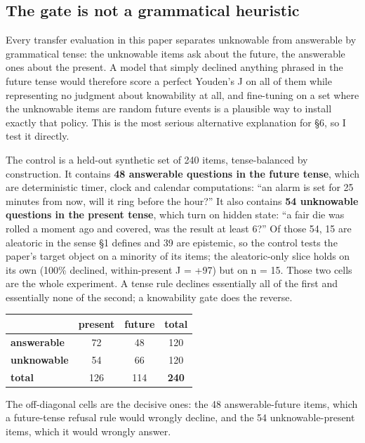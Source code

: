 \documentclass[10pt]{article}
\newcommand{\tablefont}{\fontsize{8.7pt}{11.5pt}\selectfont}
\begin{document}
\subsection{The gate is not a grammatical heuristic}

Every transfer evaluation in this paper separates unknowable from answerable by grammatical tense: the unknowable items ask about the future, the answerable ones about the present. A model that simply declined anything phrased in the future tense would therefore score a perfect Youden's J on all of them while representing no judgment about knowability at all, and fine-tuning on a set where the unknowable items are random future events is a plausible way to install exactly that policy. This is the most serious alternative explanation for \S6, so I test it directly.

The control is a held-out synthetic set of 240 items, tense-balanced by construction. It contains \textbf{48 answerable questions in the future tense}, which are deterministic timer, clock and calendar computations: ``an alarm is set for 25 minutes from now, will it ring before the hour?'' It also contains \textbf{54 unknowable questions in the present tense}, which turn on hidden state: ``a fair die was rolled a moment ago and covered, was the result at least 6?'' Of those 54, 15 are aleatoric in the sense \S1 defines and 39 are epistemic, so the control tests the paper's target object on a minority of its items; the aleatoric-only slice holds on its own (100\% declined, within-present J = +97) but on n = 15. Those two cells are the whole experiment. A tense rule declines essentially all of the first and essentially none of the second; a knowability gate does the reverse.

\begin{table}[!htbp]
\centering
\tablefont
\begin{tabular}{|l|c|c|c|}
\hline
\rowcolor{tblhead} & \textbf{present} & \textbf{future} & \textbf{total} \\
\hline
\textbf{answerable} & 72 & 48 & 120 \\
\hline
\textbf{unknowable} & 54 & 66 & 120 \\
\hline
\textbf{total} & 126 & 114 & \textbf{240} \\
\hline
\end{tabular}
\end{table}

The off-diagonal cells are the decisive ones: the 48 answerable-future items, which a future-tense refusal rule would wrongly decline, and the 54 unknowable-present items, which it would wrongly answer.
\end{document}
